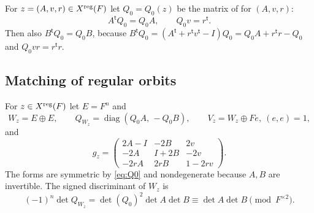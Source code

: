 \documentclass[11pt,oneside,notitlepage]{book}
\numberwithin{equation}{section}
\theoremstyle{plain}
\theoremstyle{definition}
\newcommand{\diag}{\operatorname{diag}}
\begin{document}
For $z=(A,v,r)\in X^{\rm reg}(F)$ let $Q_0=Q_0(z)$ be the matrix of  for $(A,v,r)$:
\begin{equation}\label{eq:Q0}
A^{\mathsf t}Q_0=Q_0A,\qquad Q_0v=r^{\mathsf t}.
\end{equation}
Then also $B^{\mathsf t}Q_0=Q_0B$, because $B^{\mathsf t}Q_0=(A^{\mathsf t}+r^{\mathsf t}v^{\mathsf t}-I)Q_0=Q_0A+r^{\mathsf t}r-Q_0$ and $Q_0vr=r^{\mathsf t}r$.

\subsection*{Matching of regular orbits}

For $z\in X^{\rm reg}(F)$ let $E=F^n$ and
\begin{equation}\label{eq:Wz}
W_z=E\oplus E,\qquad Q_{W_z}=\diag(Q_0A,\,-Q_0B),\qquad V_z=W_z\oplus Fe,\ (e,e)=1,
\end{equation}
and
\begin{equation}\label{eq:gz}
g_z=\begin{pmatrix}2A-I&-2B&2v\\-2A&I+2B&-2v\\-2rA&2rB&1-2rv\end{pmatrix}.
\end{equation}
The forms are symmetric by \eqref{eq:Q0} and nondegenerate because $A,B$ are invertible. The signed discriminant of $W_z$ is
\begin{equation}\label{eq:disc}
(-1)^n\det Q_{W_z}=\det(Q_0)^2\det A\det B\equiv\det A\det B\pmod{F^{\times2}}.
\end{equation}
\end{document}
